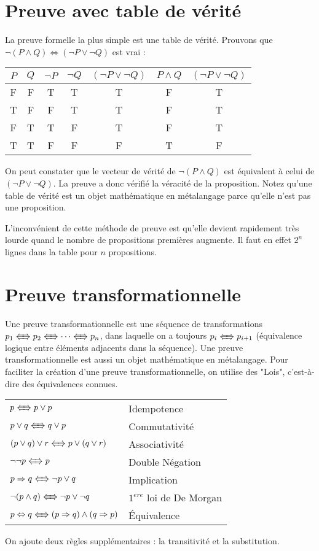 		\section{Preuve avec table de vérité}
La preuve formelle la plus simple est une table de vérité.
		Prouvons que $\lnot (P \land Q) \Leftrightarrow (\lnot P \lor \lnot Q)$ est vrai :
			\begin{center}
			\begin{tabular}{cc|ccxcx}
			$P$ & $Q$ & $\lnot P$ & $\lnot Q$ & $(\lnot P \lor \lnot Q)$ & $P \land Q$ & $ (\lnot P \lor \lnot Q)$\\
			\hline
			F&F&T&T&T&F&T\\
			T&F&F&T&T&F&T\\
			F&T&T&F&T&F&T\\
			T&T&F&F&F&T&F\\
			\end{tabular}
			\end{center}

On peut constater que le vecteur de vérité de $\lnot (P \land Q)$ est équivalent à celui de $(\lnot P \lor  \lnot Q)$. La preuve a donc vérifié la véracité de la proposition.
Notez qu'une table de vérité est un objet mathématique en métalangage
parce qu'elle n'est pas une proposition.

L'inconvénient de cette méthode de preuve est qu'elle devient rapidement très lourde quand le nombre de propositions premières augmente. Il faut en effet $2^n$ lignes dans la table pour $n$ propositions. 

\section{Preuve transformationnelle} \label{transfo_propositionelle}

Une preuve transformationnelle est une séquence de transformations
$p_1 \LRarrow p_2 \LRarrow \cdots \LRarrow p_n$,
dans laquelle on a toujours $p_i \LRarrow p_{i+1}$
(équivalence logique entre éléments adjacents dans la séquence).
Une preuve transformationnelle est aussi un objet mathématique en métalangage.
Pour faciliter la création d'une preuve transformationnelle,
on utilise des "Lois", c'est-à-dire des équivalences connues.
			\begin{center}
			\begin{tabular}{|ll|}
			\hline
			$p \LRarrow p \lor p$ & Idempotence\\
			$p \lor q \LRarrow q \lor p$ & Commutativité\\
			$(p \lor q) \lor r \LRarrow p \lor (q \lor r)$ & Associativité\\
			$ \lnot \lnot p \LRarrow p$ & Double Négation\\
			$p \Rightarrow q \LRarrow \lnot p \lor q$ & Implication\\
			$\lnot (p \land q) \LRarrow \lnot p \lor \lnot q$ & $1^{ere}$ loi de De Morgan\\
			$p \Leftrightarrow q \LRarrow (p \Rightarrow q) \land (q \Rightarrow p)$ & Équivalence\\
			\hline
			\end{tabular}
			\end{center}
On ajoute deux règles supplémentaires : la transitivité et la substitution.
